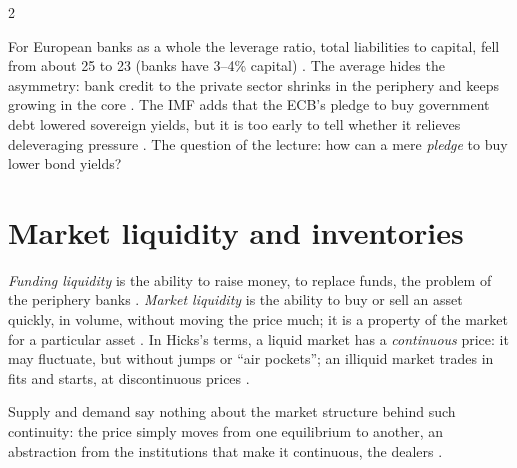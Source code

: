\begin{paracol}{2}
\begin{taccts}
\end{taccts}
For European banks as a whole the leverage ratio, total liabilities to capital, fell from about 25 to 23 (banks have 3--4\% capital) . The average
hides the asymmetry: bank credit to the private sector shrinks in the periphery and keeps growing in the core . The IMF adds that the ECB's
pledge to buy government debt lowered sovereign yields, but it is too early to tell whether it relieves deleveraging pressure . The question of the lecture:
how can a mere \emph{pledge} to buy lower bond yields? 

\section{Market liquidity and inventories}\label{sec:dl-liquidity}

\begin{definition}\label{def:dl-liq}
\emph{Funding liquidity} is the ability to raise money, to replace funds, the problem of the periphery banks . \emph{Market liquidity} is the ability to buy or
sell an asset quickly, in volume, without moving the price much; it is a property of the market for a particular asset . In Hicks's terms,
a liquid market has a \emph{continuous} price: it may fluctuate, but without jumps or ``air pockets''; an illiquid market trades in fits and starts, at discontinuous prices
.
\end{definition}

Supply and demand say nothing about the market structure behind such continuity: the price simply moves from one equilibrium to another, an abstraction from the
institutions that make it continuous, the dealers .


\end{paracol}
